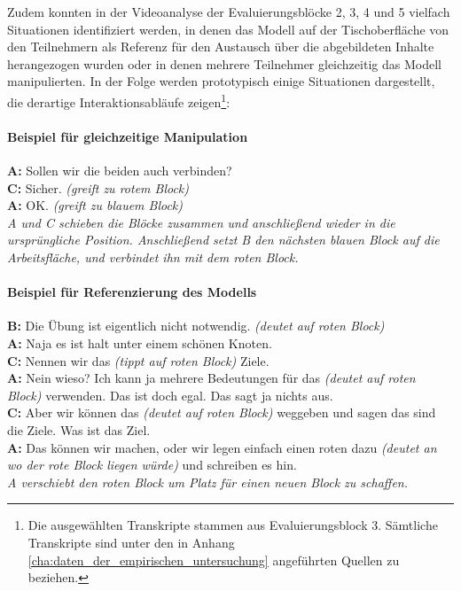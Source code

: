 Zudem konnten in der Videoanalyse der Evaluierungsblöcke 2, 3, 4 und 5 vielfach Situationen identifiziert werden, in denen das Modell auf der Tischoberfläche von den Teilnehmern als Referenz für den Austausch über die abgebildeten Inhalte herangezogen wurden oder in denen mehrere Teilnehmer gleichzeitig das Modell manipulierten. In der Folge werden prototypisch einige Situationen dargestellt, die derartige Interaktionsabläufe zeigen\footnote{Die ausgewählten Transkripte stammen aus Evaluierungsblock 3. Sämtliche Transkripte sind unter den in Anhang \ref{cha:daten_der_empirischen_untersuchung} angeführten Quellen zu beziehen.}:

\paragraph{Beispiel für gleichzeitige Manipulation} %
\begin{transkript}
	\textbf{A:} Sollen wir die beiden auch verbinden? \\
	\textbf{C:} Sicher. \emph{(greift zu rotem Block)} \\
	\textbf{A:} OK. \emph{(greift zu blauem Block)} \\
	\emph{A und C schieben die Blöcke zusammen und anschließend wieder in die ursprüngliche Position. Anschließend setzt B den nächsten blauen Block auf die Arbeitsfläche, und verbindet ihn mit dem roten Block.} \\
\end{transkript}

\paragraph{Beispiel für Referenzierung des Modells} %
\begin{transkript}
	\textbf{B:} Die Übung ist eigentlich nicht notwendig. \emph{(deutet auf roten Block)} \\
	\textbf{A:} Naja es ist halt unter einem schönen Knoten. \\
	\textbf{C:} Nennen wir das \emph{(tippt auf roten Block)} Ziele. \\
	\textbf{A:} Nein wieso? Ich kann ja mehrere Bedeutungen für das \emph{(deutet auf roten Block)} verwenden. Das ist doch egal. Das sagt ja nichts aus. \\
	\textbf{C:} Aber wir können das \emph{(deutet auf roten Block)} weggeben und sagen das sind die Ziele. Was ist das Ziel. \\
	\textbf{A:} Das können wir machen, oder wir legen einfach einen roten dazu \emph{(deutet an wo der rote Block liegen würde)} und schreiben es hin. \\
	\emph{A verschiebt den roten Block um Platz für einen neuen Block zu schaffen.} \\
\end{transkript}


